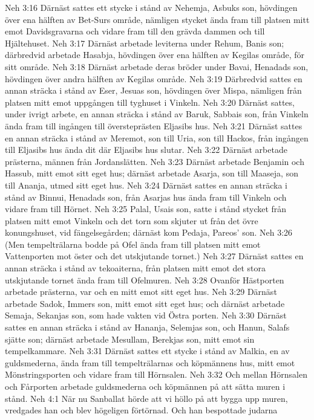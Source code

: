 Neh 3:16  Därnäst sattes ett stycke i stånd av Nehemja, Asbuks son, hövdingen över ena hälften av Bet-Surs område, nämligen stycket ända fram till platsen mitt emot Davidsgravarna och vidare fram till den grävda dammen och till Hjältehuset.
Neh 3:17  Därnäst arbetade leviterna under Rehum, Banis son; därbredvid arbetade Hasabja, hövdingen över ena hälften av Kegilas område, för sitt område.
Neh 3:18  Därnäst arbetade deras bröder under Bavai, Henadads son, hövdingen över andra hälften av Kegilas område.
Neh 3:19  Därbredvid sattes en annan sträcka i stånd av Eser, Jesuas son, hövdingen över Mispa, nämligen från platsen mitt emot uppgången till tyghuset i Vinkeln.
Neh 3:20  Därnäst sattes, under ivrigt arbete, en annan sträcka i stånd av Baruk, Sabbais son, från Vinkeln ända fram till ingången till översteprästen Eljasibs hus.
Neh 3:21  Därnäst sattes en annan sträcka i stånd av Meremot, son till Uria, son till Hackos, från ingången till Eljasibs hus ända dit där Eljasibs hus slutar.
Neh 3:22  Därnäst arbetade prästerna, männen från Jordanslätten.
Neh 3:23  Därnäst arbetade Benjamin och Hassub, mitt emot sitt eget hus; därnäst arbetade Asarja, son till Maaseja, son till Ananja, utmed sitt eget hus.
Neh 3:24  Därnäst sattes en annan sträcka i stånd av Binnui, Henadads son, från Asarjas hus ända fram till Vinkeln och vidare fram till Hörnet.
Neh 3:25  Palal, Usais son, satte i stånd stycket från platsen mitt emot Vinkeln och det torn som skjuter ut från det övre konungshuset, vid fängelsegården; därnäst kom Pedaja, Pareos' son.
Neh 3:26  (Men tempelträlarna bodde på Ofel ända fram till platsen mitt emot Vattenporten mot öster och det utskjutande tornet.)
Neh 3:27  Därnäst sattes en annan sträcka i stånd av tekoaiterna, från platsen mitt emot det stora utskjutande tornet ända fram till Ofelmuren.
Neh 3:28  Ovanför Hästporten arbetade prästerna, var och en mitt emot sitt eget hus.
Neh 3:29  Därnäst arbetade Sadok, Immers son, mitt emot sitt eget hus; och därnäst arbetade Semaja, Sekanjas son, som hade vakten vid Östra porten.
Neh 3:30  Därnäst sattes en annan sträcka i stånd av Hananja, Selemjas son, och Hanun, Salafs sjätte son; därnäst arbetade Mesullam, Berekjas son, mitt emot sin tempelkammare.
Neh 3:31  Därnäst sattes ett stycke i stånd av Malkia, en av guldsmederna, ända fram till tempelträlarnas och köpmännens hus, mitt emot Mönstringsporten och vidare fram till Hörnsalen.
Neh 3:32  Och mellan Hörnsalen och Fårporten arbetade guldsmederna och köpmännen på att sätta muren i stånd.
Neh 4:1  När nu Sanballat hörde att vi höllo på att bygga upp muren, vredgades han och blev högeligen förtörnad. Och han bespottade judarna
